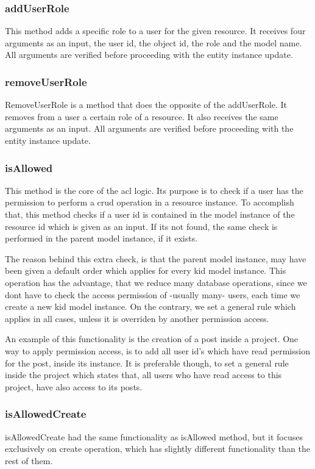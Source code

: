 \subsubsection{addUserRole}
This method adds a specific role to a user for the given resource. It receives four arguments as an input, the user id, the object id, the role and the model name. All arguments are verified before proceeding with the entity instance update.
\subsubsection{removeUserRole}
RemoveUserRole is a method that does the opposite of the addUserRole. It removes from a user a certain role of a resource. It also receives the same arguments as an input. All arguments are verified before proceeding with the entity instance update.
\subsubsection{isAllowed}
This method is the core of the acl logic. Its purpose is to check if  a user has the permission to perform a crud operation in a resource instance. To accomplish that, this method checks if a user id is contained in the model instance of the resource id which is given as an input. If its not found, the same check is performed in the parent model instance, if it exists. \par 
	The reason behind this extra check, is that the parent model instance, may have been given a default order which applies for every kid model instance. This operation has the advantage, that we reduce many database operations, since we dont have to check the access permission of -usually many- users, each time we create a new kid model instance. On the contrary, we set a general rule which applies in all cases, unless it is overriden by another permission access. \par
	An example of this functionality is the creation of a post inside a project. One way to apply permission access, is to add all user id's which have read permission for the post, inside its instance. It is preferable though, to set a general rule inside the project which states that, all users who have read access to this project, have also access to its posts.

\subsubsection{isAllowedCreate}
isAllowedCreate had the same functionality as isAllowed method, but it focuses exclusively on create operation, which has slightly different functionality than the rest of them.

